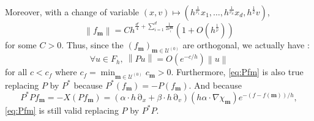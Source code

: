 \documentclass[12pt]{amsart}
\numberwithin{equation}{section}
\numberwithin{figure}{section}
\def\m{\mathbf{m}}
\DeclareMathOperator{\p}{\partial}
\newcommand{\vvert}[1]{\left\lVert#1\right\rVert}
\def\uuu{{\mathcal U}}\def\vvv{{\mathcal V}}\def\www{{\mathcal W}}\def\xxx{{\mathcal X}}
\begin{document}
Moreover, with a change of variable $(x,v)\mapsto(h^{\frac{1}{\nu_1}}x_1,\ldots,h^{\frac{1}{\nu_d}}x_d,h^{\frac12}v)$,
\begin{equation*}
\vvert{f_\m} = Ch^{\frac{d'}{4} + \sum_{i=1}^d\frac{1}{2\nu_i^\m}}(1+O(h^\frac{1}{\overline\nu}))
\end{equation*}
for some $C>0$. Thus, since the $(f_\m)_{\m\in\uuu^{(0)}}$ are orthogonal, we actually have :
\begin{equation}\label{eq:Pfm}
\forall u\in F_h,\ \vvert{Pu}=O(e^{-c/h})\vvert{u}
\end{equation}
for all $c<c_f$ where $c_f=\min_{\m\in\uuu^{(0)}}c_\m>0$. Furthermore, \eqref{eq:Pfm} is also true replacing $P$ by $P^*$ because $P^*(f_\m)=-P(f_\m)$. And because
\begin{equation*}
P^*Pf_\m = -X(Pf_\m) = (\alpha\cdot h\p_x + \beta\cdot h\p_v)(h\alpha\cdot\nabla\chi_\m)e^{-(f-f(\m))/h},
\end{equation*}
\eqref{eq:Pfm} is still valid replacing $P$ by $P^*P$.
\end{document}
